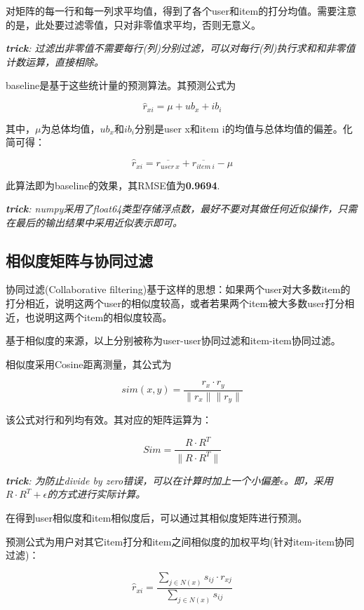 \documentclass[utf8, a4paper, 11pt, onecolumn]{ctexart}
\begin{document}
\begin{spacing}{1.3}
对矩阵的每一行和每一列求平均值，得到了各个user和item的打分均值。需要注意的是，此处要过滤零值，只对非零值求平均，否则无意义。

\textit{\textbf{trick}: 过滤出非零值不需要每行(列)分别过滤，可以对每行(列)执行求和和非零值计数运算，直接相除。}

baseline是基于这些统计量的预测算法。其预测公式为

\[\hat{r}_{xi} = \mu + ub_{x} + ib_{i}\]

其中，$\mu$为总体均值，$ub_{x}$和$ib_{i}$分别是user x和item i的均值与总体均值的偏差。化简可得：

\[\hat{r}_{xi} = \overline{r_{user\ x}}+ \overline{r_{item\ i}} - \mu\]

此算法即为baseline的效果，其RMSE值为\textbf{0.9694}.

\textit{\textbf{trick}: numpy采用了float64类型存储浮点数，最好不要对其做任何近似操作，只需在最后的输出结果中采用近似表示即可。}


\subsection{相似度矩阵与协同过滤}

协同过滤(Collaborative filtering)基于这样的思想：如果两个user对大多数item的打分相近，说明这两个user的相似度较高，或者若果两个item被大多数user打分相近，也说明这两个item的相似度较高。

基于相似度的来源，以上分别被称为user-user协同过滤和item-item协同过滤。

相似度采用Cosine距离测量，其公式为

\[sim(x,y) = \frac{r_x \cdot r_y}{\| r_x \| \| r_y\|}\]

该公式对行和列均有效。其对应的矩阵运算为：

\[Sim = \frac{R \cdot R^T}{\| R\cdot R^T \|}\]

\textit{\textbf{trick}: 为防止divide by zero错误，可以在计算时加上一个小偏差$\epsilon$。即，采用$R\cdot R^T + \epsilon$的方式进行实际计算。}

在得到user相似度和item相似度后，可以通过其相似度矩阵进行预测。

预测公式为用户对其它item打分和item之间相似度的加权平均(针对item-item协同过滤)：

\[\hat{r}_{xi} = \frac{\sum_{j \in N(x)} s_{ij} \cdot r_{xj}}{\sum_{j \in N(x)} s_{ij}} \]


\end{spacing}
\end{document}
